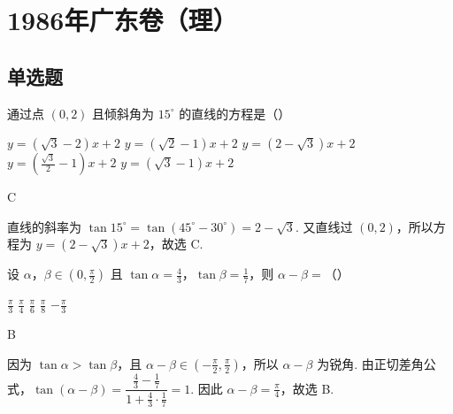 \documentclass[UTF8,a4paper,oneside,11pt]{ctexbook}
\begin{document}
\mainmatter

\chapter{1986年广东卷（理）}

\section{单选题}


\begin{problem}

通过点 \((0,2)\) 且倾斜角为 \(15^{\circ}\) 的直线的方程是（\quad）

\choicesfive
    {\(y=\left(\sqrt{3}-2\right)x+2 \)}
    {\(y=\left(\sqrt{2}-1\right)x+2 \)}
    {\(y=\left(2-\sqrt{3}\right)x+2 \)}
    {\(y=\left(\frac{\sqrt{3}}{2}-1\right)x+2 \)}
    {\(y=\left(\sqrt{3}-1\right)x+2 \)}
\end{problem}

\begin{answer}
C
\end{answer}

\begin{solution}
直线的斜率为 \(\tan15^{\circ}=\tan(45^{\circ}-30^{\circ})=2-\sqrt{3}\). 又直线过 \((0,2)\)，所以方程为 \(y=(2-\sqrt{3})x+2\)，故选 C.
\end{solution}

\begin{problem}

设 \(\alpha\)，\(\beta \in \left(0, \frac{\pi}{2}\right)\) 且 \(\tan\alpha = \frac{4}{3} \)，\(\tan\beta = \frac{1}{7} \)，则 \(\alpha - \beta = \)（\quad）

\choicesfive
    {\(\frac{\pi}{3} \)}
    {\(\frac{\pi}{4} \)}
    {\(\frac{\pi}{6} \)}
    {\(\frac{\pi}{8} \)}
    {\(-\frac{\pi}{3} \)}
\end{problem}

\begin{answer}
B
\end{answer}

\begin{solution}
因为 \(\tan\alpha>\tan\beta\)，且 \(\alpha-\beta\in\left(-\frac{\pi}{2},\frac{\pi}{2}\right)\)，所以 \(\alpha-\beta\) 为锐角. 由正切差角公式，\(\tan(\alpha-\beta)=\dfrac{\frac{4}{3}-\frac{1}{7}}{1+\frac{4}{3}\cdot\frac{1}{7}}=1\). 因此 \(\alpha-\beta=\frac{\pi}{4}\)，故选 B.
\end{solution}
\end{document}
